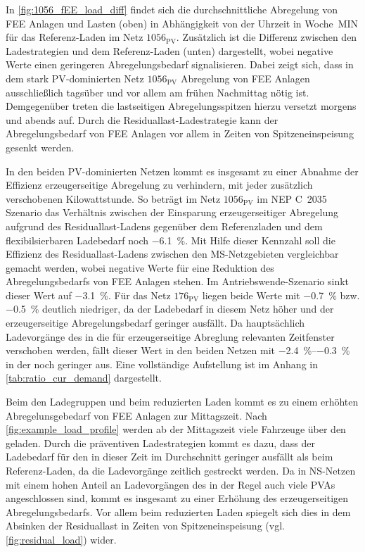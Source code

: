 In \autoref{fig:1056_fEE_load_diff} findet sich die durchschnittliche Abregelung von \gls{FEE} Anlagen und Lasten (oben) in Abhängigkeit von der Uhrzeit in Woche~MIN für das Referenz-Laden im Netz \(1056_{\text{PV}}\).
Zusätzlich ist die Differenz zwischen den Ladestrategien und dem Referenz-Laden (unten) dargestellt, wobei negative Werte einen geringeren Abregelungsbedarf signalisieren.
Dabei zeigt sich, dass in dem stark \gls{PV}-dominierten Netz \(1056_{\text{PV}}\) Abregelung von \gls{FEE} Anlagen ausschließlich tagsüber und vor allem am frühen Nachmittag nötig ist.
Demgegenüber treten die lastseitigen Abregelungsspitzen hierzu versetzt morgens und abends auf.
Durch die Residuallast-Ladestrategie kann der Abregelungsbedarf von \gls{FEE} Anlagen vor allem in Zeiten von Spitzeneinspeisung gesenkt werden.\medskip

In den beiden \gls{PV}-dominierten Netzen kommt es insgesamt zu einer Abnahme der Effizienz erzeugerseitige Abregelung zu verhindern, mit jeder zusätzlich verschobenen Kilowattstunde.
So beträgt im Netz \(1056_{\text{PV}}\) im NEP C~\num{2035} Szenario das Verhältnis zwischen der Einsparung erzeugerseitiger Abregelung aufgrund des Residuallast-Ladens gegenüber dem Referenzladen und dem flexibilsierbaren Ladebedarf noch \SI{-6.1}{\percent}.
Mit Hilfe dieser Kennzahl soll die Effizienz des Residuallast-Ladens zwischen den \gls{MS}-Netzgebieten vergleichbar gemacht werden, wobei negative Werte für eine Reduktion des Abregelungsbedarfs von \gls{FEE} Anlagen stehen.
Im Antriebswende-Szenario sinkt dieser Wert auf \SI{-3.1}{\percent}.
Für das Netz \(176_{\text{PV}}\) liegen beide Werte mit \SI{-0.7}{\percent} bzw. \SI{-0.5}{\percent} deutlich niedriger, da der Ladebedarf in diesem Netz höher und der erzeugerseitige Abregelungsbedarf geringer ausfällt.
Da hauptsächlich Ladevorgänge des \UC \Firmeparkplatz in die für erzeugerseitige Abreglung relevanten Zeitfenster verschoben werden, fällt dieser Wert in den beiden Netzen mit \SIrange[range-phrase=~bzw.~]{-2.4}{-0.3}{\percent} in der \SzeFirmenparkplatz noch geringer aus.
Eine vollständige Aufstellung ist im Anhang in \autoref{tab:ratio_cur_demand} dargestellt.



Beim den Ladegruppen und beim reduzierten Laden kommt es zu einem erhöhten Abregelunsgebedarf von \gls{FEE} Anlagen zur Mittagszeit.
Nach \autoref{fig:example_load_profile} werden ab der Mittagszeit viele Fahrzeuge über den \UC \zH geladen.
Durch die präventiven Ladestrategien kommt es dazu, dass der Ladebedarf für den \UC \zH in dieser Zeit im Durchschnitt geringer ausfällt als beim Referenz-Laden, da die Ladevorgänge zeitlich gestreckt werden.
Da in \gls{NS}-Netzen mit einem hohen Anteil an Ladevorgängen des \UC \zH in der Regel auch viele \glspl{PVA} angeschlossen sind, kommt es insgesamt zu einer Erhöhung des erzeugerseitigen Abregelungsbedarfs.
Vor allem beim reduzierten Laden spiegelt sich dies in dem Absinken der Residuallast in Zeiten von Spitzeneinspeisung (vgl. \autoref{fig:residual_load}) wider.


